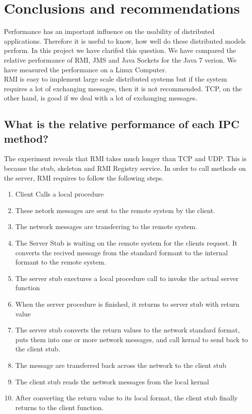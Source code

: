 \documentclass{article}
\begin{document}
\section{Conclusions and recommendations}

Performance has an important influence on the usability of distributed applications. Therefore it is useful to know, how well do these distributed models perform. In this project we have clarifed this question. We have compared the relative performance of RMI, JMS and Java Sockets for the Java 7 verion. We have measured the performance on a Linux Computer. \\

RMI is easy to implement large scale distributed systems but if the system requires a lot of exchanging messages, then it is not recommended. TCP, on the other hand, is good if we deal with a lot of exchanging messages. \\

\subsection{What is the relative performance of each IPC method?} 
The experiment reveals that RMI takes much longer than TCP and UDP. This is because the stub, skeleton and RMI Registry service. In order to call methods on the server, RMI requires to follow the following steps.
\begin{enumerate}
\item Client Calls a local procedure
\item These netork messages are sent to the remote system by the client.
\item The network messages are transferring to the remote system.
\item The Server Stub is waiting on the remote system for the clients request. It converts the recived message from the standard formant to the internal formant to the remote system.
\item The server stub exectures a local procedure call to invoke the actual server function
\item When the server procedure is finished, it returns to server stub with return value
\item The server stub converts the return values to the network standard format, puts them into one or more network messages, and call kernal to send back to the client stub.
\item The message are transferred back across the network to the client stub
\item The client stub reads the network messages from the local kernal
\item After converting the return value to its local format, the client stub finally returns to the client function.
\end{enumerate}
\end{document}
